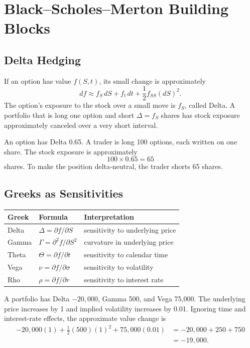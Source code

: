 \section{Black--Scholes--Merton Building Blocks}

\subsection{Delta Hedging}

If an option has value $f(S,t)$, its small change is approximately
\[
    df \approx f_S\,dS + f_t\,dt + \frac{1}{2}f_{SS}(dS)^2.
\]
The option's exposure to the stock over a small move is $f_S$, called Delta.
A portfolio that is long one option and short $\Delta=f_S$ shares has stock
exposure approximately canceled over a very short interval.

\begin{exmp}
An option has Delta 0.65. A trader is long 100 options, each written on one
share. The stock exposure is approximately
\[
    100\times 0.65=65
\]
shares. To make the position delta-neutral, the trader shorts 65 shares.
\end{exmp}

\subsection{Greeks as Sensitivities}

\begin{tabular}{@{}lll@{}}
\toprule
Greek & Formula & Interpretation \\
\midrule
Delta & $\Delta=\partial f/\partial S$ & sensitivity to underlying price \\
Gamma & $\Gamma=\partial^2 f/\partial S^2$ & curvature in underlying price \\
Theta & $\Theta=\partial f/\partial t$ & sensitivity to calendar time \\
Vega & $\nu=\partial f/\partial \sigma$ & sensitivity to volatility \\
Rho & $\rho=\partial f/\partial r$ & sensitivity to interest rate \\
\bottomrule
\end{tabular}

\begin{exmp}
A portfolio has Delta $-20{,}000$, Gamma 500, and Vega 75,000. The underlying
price increases by 1 and implied volatility increases by 0.01. Ignoring time and
interest-rate effects, the approximate value change is
\[
\begin{aligned}
    -20{,}000(1)+\frac{1}{2}(500)(1)^2+75{,}000(0.01)
    &=
    -20{,}000+250+750
    \\
    &=
    -19{,}000.
\end{aligned}
\]
\end{exmp}

